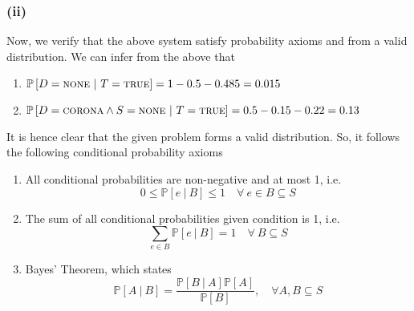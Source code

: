 \documentclass[12pt]{article}
\newcommand{\prob}[1]{\mathbb{P}\left[#1\right]}
\newcommand{\true}{\textsc{true}}
\begin{document}
    \subsubsection*{(ii)}
    Now, we verify that the above system satisfy probability axioms and from a valid distribution. We
    can infer from the above that
    \begin{enumerate}
        \item $\prob{D = \textsc{none} \ | \ T = \true} = 1 - 0.5 - 0.485 = 0.015$
        \item $\prob{D = \textsc{corona} \wedge S = \textsc{none} \ | \ T = \true} = 0.5 - 0.15 - 0.22 = 0.13$
    \end{enumerate}
    It is hence clear that the given problem forms a valid distribution. So, it follows the
    following conditional probability axioms
    \begin{enumerate}
        \item All conditional probabilities are non-negative and at most 1, i.e. $$0 \leq \prob{e \ | \ B} \leq 1 \quad \forall \ e \in B \subseteq S$$
        \item The sum of all conditional probabilities given condition is 1, i.e. $$\sum_{e \in B} \prob{e \ | \ B} = 1 \quad \forall \ B \subseteq S$$
        \item Bayes' Theorem, which states $$\prob{ A \ | \ B} = \frac{\prob{B \ | \ A} \prob{A}}{\prob{B}}, \quad \forall A, B \subseteq S$$
    \end{enumerate}
\end{document}
